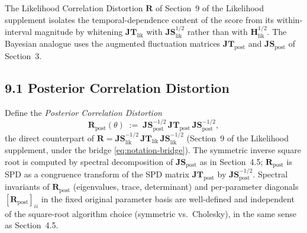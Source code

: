 \documentclass[11pt]{article}
\begin{document}
The Likelihood Correlation Distortion $\mathbf R$ of Section~9 of the Likelihood supplement isolates the temporal-dependence content of the score from its within-interval magnitude by whitening $\mathbf{JT}_{\mathrm{lik}}$ with $\mathbf{JS}_{\mathrm{lik}}^{1/2}$ rather than with $\mathbf H_{\mathrm{lik}}^{1/2}$. The Bayesian analogue uses the augmented fluctuation matrices $\mathbf{JT}_{\mathrm{post}}$ and $\mathbf{JS}_{\mathrm{post}}$ of Section~3.

\subsection*{9.1 Posterior Correlation Distortion}

Define the \emph{Posterior Correlation Distortion}
\begin{equation}
\mathbf R_{\mathrm{post}}(\theta)
\;:=\;
\mathbf{JS}_{\mathrm{post}}^{-1/2}\,
\mathbf{JT}_{\mathrm{post}}\,
\mathbf{JS}_{\mathrm{post}}^{-1/2},
\label{eq:posterior-r-def}
\end{equation}
the direct counterpart of $\mathbf R = \mathbf{JS}_{\mathrm{lik}}^{-1/2}\, \mathbf{JT}_{\mathrm{lik}}\, \mathbf{JS}_{\mathrm{lik}}^{-1/2}$ (Section~9 of the Likelihood supplement, under the bridge \eqref{eq:notation-bridge}). The symmetric inverse square root is computed by spectral decomposition of $\mathbf{JS}_{\mathrm{post}}$ as in Section~4.5; $\mathbf R_{\mathrm{post}}$ is SPD as a congruence transform of the SPD matrix $\mathbf{JT}_{\mathrm{post}}$ by $\mathbf{JS}_{\mathrm{post}}^{-1/2}$. Spectral invariants of $\mathbf R_{\mathrm{post}}$ (eigenvalues, trace, determinant) and per-parameter diagonals $[\mathbf R_{\mathrm{post}}]_{ii}$ in the fixed original parameter basis are well-defined and independent of the square-root algorithm choice (symmetric vs.\ Cholesky), in the same sense as Section~4.5.
\end{document}
